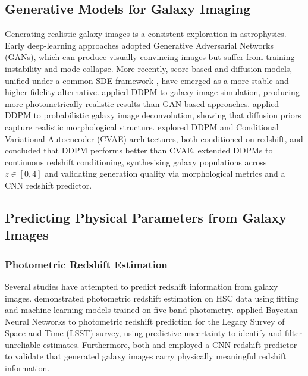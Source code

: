 \documentclass[fleqn,usenatbib]{mnras}
\begin{document}
\subsection{Generative Models for Galaxy Imaging}

Generating realistic galaxy images is a consistent exploration in astrophysics.
Early deep-learning approaches adopted Generative Adversarial Networks
(GANs), which can produce visually convincing images but suffer from
training instability and mode collapse.
More recently, score-based and diffusion models, unified under a
common SDE framework \citep{song2021}, have emerged as a more
stable and higher-fidelity alternative.
\citet{smith2022} applied DDPM to galaxy image
simulation, producing more photometrically realistic results than
GAN-based approaches.
\citet{xue2023} applied DDPM to probabilistic galaxy image
deconvolution, showing that diffusion priors capture realistic
morphological structure.
\citet{li2024} explored DDPM and Conditional Variational
Autoencoder (CVAE) architectures, both conditioned on redshift, and concluded that DDPM performs better than CVAE.
\citet{lizarraga2024} extended DDPMs to continuous redshift conditioning,
synthesising galaxy populations across $z \in [0, 4]$ and validating
generation quality via morphological metrics and a CNN redshift predictor.


\subsection{Predicting Physical Parameters from Galaxy Images}

\subsubsection{Photometric Redshift Estimation}

Several studies have attempted to predict redshift information from galaxy images.
\citet{nishizawa2020} demonstrated photometric redshift
estimation on HSC data using fitting and machine-learning models trained on
five-band photometry.
\citet{jones2024} applied Bayesian Neural Networks to photometric
redshift prediction for the Legacy Survey of Space and Time (LSST) survey, using predictive uncertainty
to identify and filter unreliable estimates. Furthermore, both \citet{li2024} and \citet{lizarraga2024} employed a CNN redshift predictor to validate that generated galaxy images carry physically meaningful redshift information.
\end{document}
